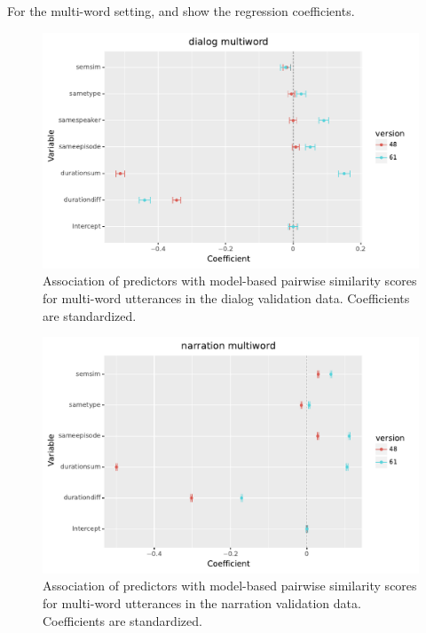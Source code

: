 For the multi-word setting,  and
 show the regression coefficients.
\begin{figure}
  \centering
  \includegraphics[scale=0.66]{results/grsa_dialog_multiword_coef.pdf}
  \caption{Association of predictors with 
    model-based pairwise similarity scores for multi-word utterances
    in the dialog validation data. Coefficients are standardized.}
  \label{fig:coef_multiword_dialog}
\end{figure}

\begin{figure}
  \centering
  \includegraphics[scale=0.66]{results/grsa_narration_multiword_coef.pdf}
  \caption{Association of predictors with 
    model-based pairwise similarity scores for multi-word utterances
    in the narration validation data. Coefficients are standardized.}
  \label{fig:coef_multiword_narration}
\end{figure}


